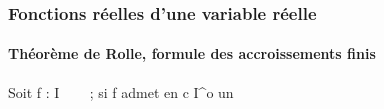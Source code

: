 %
\subsubsection{Fonctions réelles d'une variable réelle}
%
\paragraph{Théorème de Rolle, formule des accroissements finis}
%
\begin{lem}
Soit f : I \rightarrow~ ~~; si f admet en c \in I^o un
\end{lem}
%
%
%
%
%
%
%

